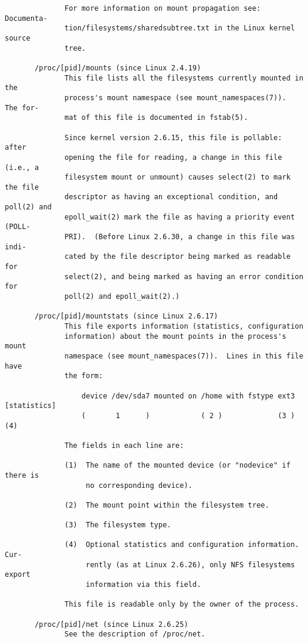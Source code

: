 \documentclass[]{article}
\begin{document}
\begin{verbatim}
              For more information on mount propagation see: Documenta‐
              tion/filesystems/sharedsubtree.txt in the Linux kernel source
              tree.

       /proc/[pid]/mounts (since Linux 2.4.19)
              This file lists all the filesystems currently mounted in the
              process's mount namespace (see mount_namespaces(7)).  The for‐
              mat of this file is documented in fstab(5).

              Since kernel version 2.6.15, this file is pollable: after
              opening the file for reading, a change in this file (i.e., a
              filesystem mount or unmount) causes select(2) to mark the file
              descriptor as having an exceptional condition, and poll(2) and
              epoll_wait(2) mark the file as having a priority event (POLL‐
              PRI).  (Before Linux 2.6.30, a change in this file was indi‐
              cated by the file descriptor being marked as readable for
              select(2), and being marked as having an error condition for
              poll(2) and epoll_wait(2).)

       /proc/[pid]/mountstats (since Linux 2.6.17)
              This file exports information (statistics, configuration
              information) about the mount points in the process's mount
              namespace (see mount_namespaces(7)).  Lines in this file have
              the form:

                  device /dev/sda7 mounted on /home with fstype ext3 [statistics]
                  (       1      )            ( 2 )             (3 ) (4)

              The fields in each line are:

              (1)  The name of the mounted device (or "nodevice" if there is
                   no corresponding device).

              (2)  The mount point within the filesystem tree.

              (3)  The filesystem type.

              (4)  Optional statistics and configuration information.  Cur‐
                   rently (as at Linux 2.6.26), only NFS filesystems export
                   information via this field.

              This file is readable only by the owner of the process.

       /proc/[pid]/net (since Linux 2.6.25)
              See the description of /proc/net.


\end{verbatim}
\end{document}
